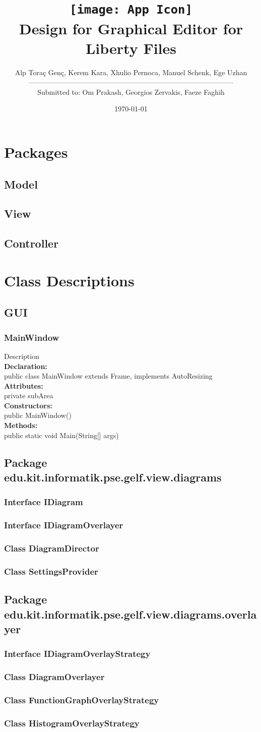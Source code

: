 \documentclass[10pt,a4paper]{report}
\title{\texttt{[image: App Icon]}\\Design for Graphical Editor for Liberty Files}
\author{Alp Toraç Genç, Kerem Kara, Xhulio Pernoca, Manuel Schenk, Ege Uzhan \leavevmode \\---------------------------------------------------------------------------------------\\
Submitted to: Om Prakash, Georgios Zervakis, Faeze Faghih}
\date{\today}
\newcommand{\public}{\textcolor{col:public}{public }}
\newcommand{\private}{\textcolor{col:private}{private }}
\newcommand{\class}{\textcolor{col:class}{class }}
\newcommand{\type}[1]{\textcolor{col:class}{#1}}
\newcommand{\extends}{\textcolor{col:sub}{extends }}
\newcommand{\implements}{\textcolor{col:sub}{implements }}
\newcommand{\static}{\textcolor{col:static}{static }}
\newcommand{\desc}[3]{
    #1{#2 #3}
}
\newcommand{\classdesc}[1]{
    \desc{\subsection}{Class}{#1}
}
\newcommand{\interfacedesc}[1]{
    \desc{\subsection}{Interface}{#1}
}
\newcommand{\packagedesc}[1]{
    \desc{\section}{Package}{#1}
}
\newcommand{\defineclass}[4]{
\textbf{Declaration:}
\\\indent #1
\\\textbf{Attributes:}
\\\indent#2
\\\textbf{Constructors:}
\\\indent#3
\\\textbf{Methods:}
\\\indent#4
}
\begin{document}
\maketitle
\label{sec:title}
\tableofcontents

\chapter{Packages}
    \section{Model}
    \section{View}
    \section{Controller}

\chapter{Class Descriptions}
\section{GUI}
\subsection{MainWindow}
Description
\\\defineclass{\public \class MainWindow \extends Frame, \implements AutoResizing}
{\private subArea}
{\public MainWindow()}
{\public \static \type{void} Main(\type{String[]} args)}

\packagedesc{edu.kit.informatik.pse.gelf.view.diagrams}

\interfacedesc{IDiagram}

\interfacedesc{IDiagramOverlayer}

\classdesc{DiagramDirector}

\classdesc{SettingsProvider}

\packagedesc{edu.kit.informatik.pse.gelf.view.diagrams.overlayer}

\interfacedesc{IDiagramOverlayStrategy}

\classdesc{DiagramOverlayer}

\classdesc{FunctionGraphOverlayStrategy}

\classdesc{HistogramOverlayStrategy}
\end{document}
